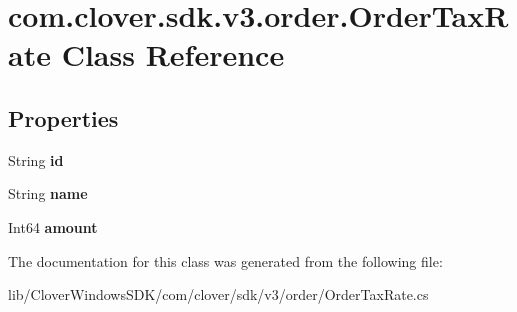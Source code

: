 \hypertarget{classcom_1_1clover_1_1sdk_1_1v3_1_1order_1_1_order_tax_rate}{}\section{com.\+clover.\+sdk.\+v3.\+order.\+Order\+Tax\+Rate Class Reference}
\label{classcom_1_1clover_1_1sdk_1_1v3_1_1order_1_1_order_tax_rate}
\subsection*{Properties}
\begin{DoxyCompactItemize}
\item 
\mbox{\label{classcom_1_1clover_1_1sdk_1_1v3_1_1order_1_1_order_tax_rate_a518f53e255d745e829b1a8da8f4a7422}} 
String {\bfseries id}
\item 
\mbox{\label{classcom_1_1clover_1_1sdk_1_1v3_1_1order_1_1_order_tax_rate_aaf865ec6aabb1f502a32607550540de0}} 
String {\bfseries name}
\item 
\mbox{\label{classcom_1_1clover_1_1sdk_1_1v3_1_1order_1_1_order_tax_rate_adee5633cce953e16f5ba708dad43c956}} 
Int64 {\bfseries amount}
\end{DoxyCompactItemize}


The documentation for this class was generated from the following file\+:\begin{DoxyCompactItemize}
\item 
lib/\+Clover\+Windows\+S\+D\+K/com/clover/sdk/v3/order/Order\+Tax\+Rate.\+cs\end{DoxyCompactItemize}

